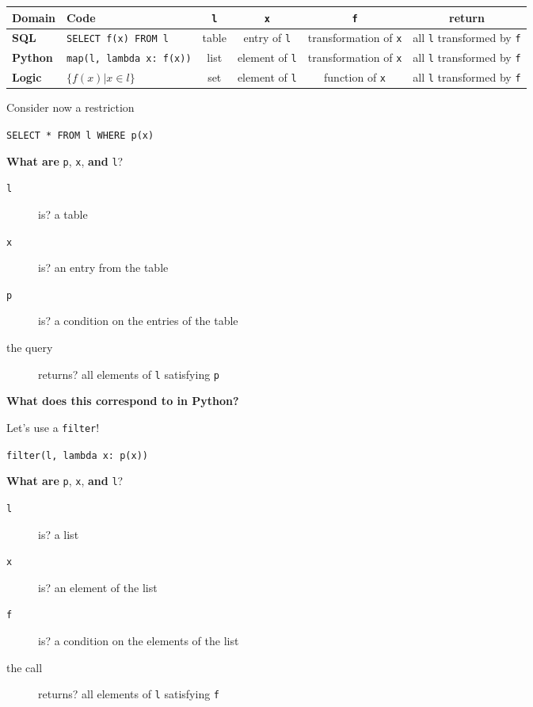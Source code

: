 \documentclass{beamer}
\begin{document}
\begin{textslide}
{
\tiny
\begin{tabular}{| l | p{1.5cm} | c | c | c | c |}
\hline
\textbf{Domain} & \textbf{Code} & \texttt{l} & \texttt{x} & \texttt{f} & \textbf{return} \\
\hline
\textbf{SQL} & \texttt{SELECT f(x) FROM l} & table & entry of \texttt{l} & transformation of \texttt{x} & all \texttt{l} transformed by \texttt{f} \\
\hline
\textbf{Python} & \texttt{map(l, lambda x: f(x))} & list & element of \texttt{l} & transformation of \texttt{x} & all \texttt{l} transformed by \texttt{f} \\
\hline
\textbf{Logic} \pause & $\{ f(x) | x \in l \}$ & set & element of \texttt{l} & function of \texttt{x} & all \texttt{l} transformed by \texttt{f} \\
\hline
\end{tabular}
}
\end{textslide}

\begin{slide}{
\item Consider now a restriction
\item \texttt{SELECT * FROM l WHERE p(x)}
\item \textbf{What are} \texttt{p}, \texttt{x}, \textbf{and} \texttt{l}?
\begin{description}
\item[\texttt{l}] is? \pause a table
\item[\texttt{x}] is? \pause an entry from the table
\item[\texttt{p}] is? \pause a condition on the entries of the table
\item[the query] returns? all elements of \texttt{l} satisfying \texttt{p}
\end{description}
\item \textbf{What does this correspond to in Python?}
}\end{slide}

\begin{slide}{
\item Let's use a \texttt{filter}!
\item \texttt{filter(l, lambda x: p(x))}
\item \textbf{What are} \texttt{p}, \texttt{x}, \textbf{and} \texttt{l}?
\begin{description}
\item[\texttt{l}] is? \pause a list
\item[\texttt{x}] is? \pause an element of the list
\item[\texttt{f}] is? \pause a condition on the elements of the list
\item[the call] returns? all elements of \texttt{l} satisfying \texttt{f}
\end{description}
}\end{slide}
\end{document}
